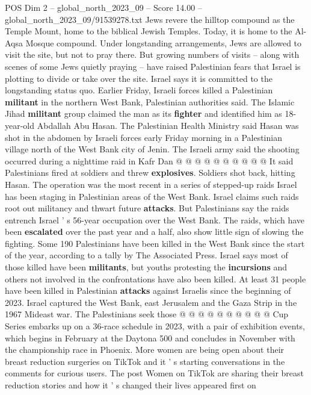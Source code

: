 \begin{textsample}{POS Dim 2 – global\_north\_2023\_09 – Score 14.00 – global\_north\_2023\_09/91539278.txt}
Jews revere the hilltop compound as the Temple Mount, home to the biblical Jewish Temples.
Today, it is home to the Al-Aqsa Mosque compound.
Under longstanding arrangements, Jews are allowed to visit the site, but not to pray there.
But growing numbers of visits -- along with scenes of some Jews quietly praying -- have raised Palestinian fears that Israel is plotting to divide or take over the site.
Israel says it is committed to the longstanding status quo.
Earlier Friday, Israeli forces killed a Palestinian \textbf{militant} in the northern West Bank, Palestinian authorities said.
The Islamic Jihad \textbf{militant} group claimed the man as its \textbf{fighter} and identified him as 18-year-old Abdallah Abu Hasan.
The Palestinian Health Ministry said Hasan was shot in the abdomen by Israeli forces early Friday morning in a Palestinian village north of the West Bank city of Jenin.
The Israeli army said the shooting occurred during a nighttime raid in Kafr Dan @ @ @ @ @ @ @ @ @ @ It said Palestinians fired at soldiers and threw \textbf{explosives}.
Soldiers shot back, hitting Hasan.
The operation was the most recent in a series of stepped-up raids Israel has been staging in Palestinian areas of the West Bank.
Israel claims such raids root out militancy and thwart future \textbf{attacks}.
But Palestinians say the raids entrench Israel ' s 56-year occupation over the West Bank.
The raids, which have been \textbf{escalated} over the past year and a half, also show little sign of slowing the fighting.
Some 190 Palestinians have been killed in the West Bank since the start of the year, according to a tally by The Associated Press.
Israel says most of those killed have been \textbf{militants}, but youths protesting the \textbf{incursions} and others not involved in the confrontations have also been killed.
At least 31 people have been killed in Palestinian \textbf{attacks} against Israelis since the beginning of 2023.
Israel captured the West Bank, east Jerusalem and the Gaza Strip in the 1967 Mideast war.
The Palestinians seek those @ @ @ @ @ @ @ @ @ @ Cup Series embarks up on a 36-race schedule in 2023, with a pair of exhibition events, which begins in February at the Daytona 500 and concludes in November with the championship race in Phoenix.
More women are being open about their breast reduction surgeries on TikTok and it ' s starting conversations in the comments for curious users.
The post Women on TikTok are sharing their breast reduction stories and how it ' s changed their lives appeared first on

\end{textsample}
